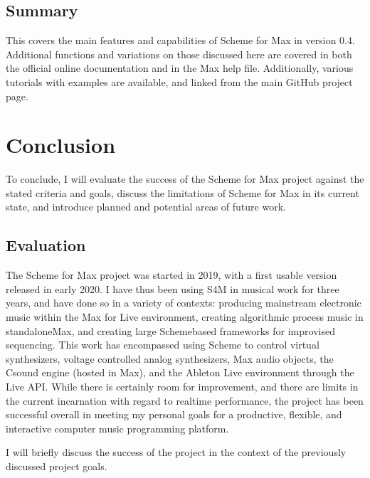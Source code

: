 \documentclass[letterpaper,10pt,english]{sphinxmanual}
\begin{document}
\section{Summary}
\label{\detokenize{features_usage:summary}}
\sphinxAtStartPar
This covers the main features and capabilities of Scheme for Max
in version 0.4.
Additional functions and variations on those discussed here are
covered in both the official online documentation and in the Max help file.
Additionally, various tutorials with examples are available, and
linked from the main GitHub project page.

\sphinxstepscope


\chapter{Conclusion}
\label{\detokenize{conclusion:conclusion}}\label{\detokenize{conclusion::doc}}
\sphinxAtStartPar
To conclude, I will evaluate the success of the Scheme for Max project
against the stated criteria and goals,
discuss the limitations of Scheme for Max in its current state, and introduce
planned and potential areas of future work.


\section{Evaluation}
\label{\detokenize{conclusion:evaluation}}
\sphinxAtStartPar
The Scheme for Max project was started in 2019, with a first usable version released in early 2020.
I have thus been using S4M in musical work for three years, and have done so
in a variety of contexts: producing mainstream electronic music within the Max for Live
environment, creating algorithmic process music in standalone\sphinxhyphen{}Max,
and creating large Scheme\sphinxhyphen{}based frameworks for improvised sequencing.
This work has encompassed
using Scheme to control virtual synthesizers, voltage controlled analog
synthesizers, Max audio objects, the Csound engine (hosted in Max), and the
Ableton Live environment through the Live API.
While there is certainly room for improvement, and there are limits in the current
incarnation with regard to realtime performance, the project has been successful overall
in meeting my personal goals for a productive, flexible, and interactive computer
music programming platform.

\sphinxAtStartPar
I will briefly discuss the success of the project in the context of the previously discussed
project goals.
\end{document}

